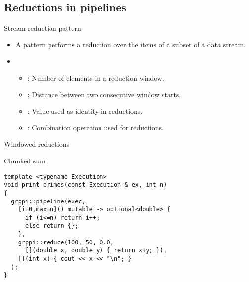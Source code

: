 \subsection{Reductions in pipelines}

\begin{frame}[t]{Stream reduction pattern}
\begin{itemize}
  \item A  pattern performs a reduction over the items of a
        subset of a data stream.
  \vfill\pause
  \item {}
    \begin{itemize}
      \item {}: Number of elements in a reduction window.
      \item {}: Distance between two consecutive window starts.
      \item {}: Value used as identity in reductions.
      \item {}: Combination operation used for reductions.
    \end{itemize}
\end{itemize}
\end{frame}

\begin{frame}[t,fragile]{Windowed reductions}
\begin{block}{Chunked sum}
\begin{lstlisting}
template <typename Execution>
void print_primes(const Execution & ex, int n)
{
  grppi::pipeline(exec,
    [i=0,max=n]() mutable -> optional<double> {
      if (i<=n) return i++;
      else return {};
    },
    grppi::reduce(100, 50, 0.0,
      [](double x, double y) { return x+y; }),
    [](int x) { cout << x << "\n"; }
  );
}
\end{lstlisting}
\end{block}
\end{frame}
